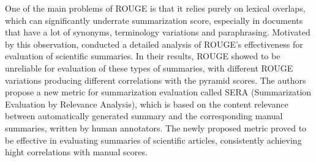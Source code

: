 \documentclass[11pt,a4paper,onecolumn]{article}
\begin{document}
One of the main problems of ROUGE is that it relies purely on lexical overlaps, which can significantly underrate summarization score, especially in documents that have a lot of synonyms, terminology variations and paraphrasing.
Motivated by this observation, \cite{cohan2016revisiting} conducted a detailed  analysis of ROUGE’s effectiveness for evaluation of scientific summaries.
In their results, ROUGE showed to be unreliable for evaluation of these types of summaries, with different ROUGE variations producing different correlations with the pyramid scores.
The authors propose a new metric for summarization evaluation called SERA (Summarization Evaluation by Relevance Analysis), which is based on the content relevance between automatically generated summary and the corresponding manual summaries, written by human annotators.
The newly proposed metric proved to be effective in evaluating summaries of scientific articles, consistently achieving hight correlations with manual scores.


%
%



\appendix
\end{document}
